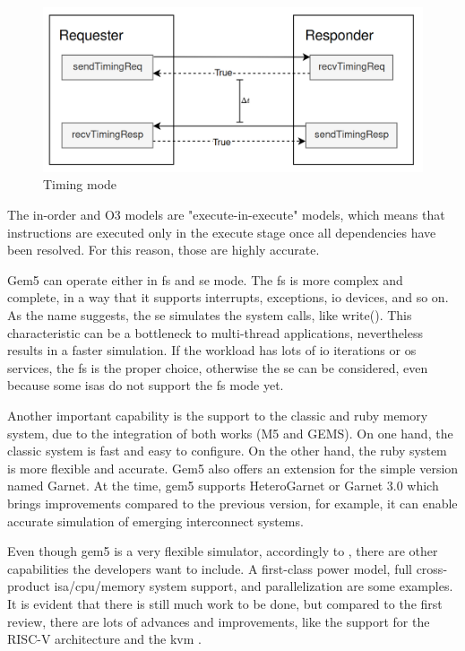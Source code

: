 \begin{figure}[H]
	\centering
 	\includegraphics[width=0.7\linewidth]{Images/TimingMode.png}
 	\caption{Timing mode}
	 \label{fig_TimingMode}
\end{figure}

The in-order and O3 models are "execute-in-execute" models, which means that instructions are executed only in the execute stage once all dependencies have been resolved. For this reason, those are highly accurate.

Gem5 can operate either in \gls{fs} and \gls{se} mode. The \gls{fs} is more complex and complete, in a way that it supports interrupts, exceptions, \gls{io} devices, and so on. As the name suggests, the \gls{se} simulates the system calls, like write(). This characteristic can be a bottleneck to multi-thread applications, nevertheless results in a faster simulation. If the workload has lots of \gls{io} iterations or \gls{os} services, the \gls{fs} is the proper choice, otherwise the \gls{se} can be considered, even because some \glspl{isa} do not support the \gls{fs} mode yet. 

Another important capability is the support to the classic and ruby memory system, due to the integration of both works (M5 and GEMS). On one hand, the classic system is fast and easy to configure. On the other hand, the ruby system is more flexible and accurate. Gem5 also offers an extension for the simple version named Garnet. At the time, gem5 supports HeteroGarnet or Garnet 3.0 which brings improvements compared to the previous version, for example, it can enable accurate simulation of emerging interconnect systems. 


Even though gem5 is a very flexible simulator, accordingly to \cite{TheGem5Simulator}, there are other capabilities the developers want to include. A first-class power model, full cross-product \gls{isa}/\gls{cpu}/memory system support, and parallelization are some examples.  It is evident that there is still much work to be done, but compared to the first review, there are lots of advances and improvements, like the support for the RISC-V architecture and the \gls{kvm} \cite{Thegem5simulatorV2}. 


